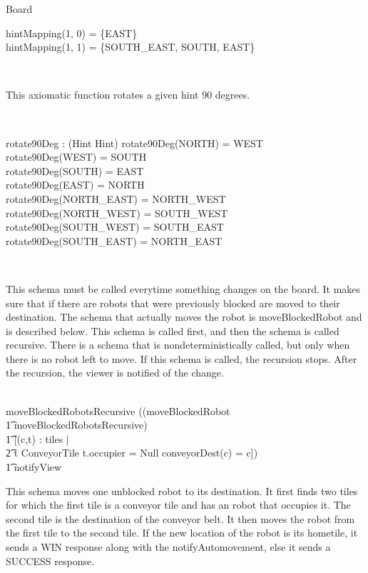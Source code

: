 \documentclass[12pt]{article}
\begin{document}
\begin{class}{Board}
\begin{axdef}
hintMapping(1, 0) = \{EAST\} \\
hintMapping(1, 1) = \{SOUTH\_EAST, SOUTH, EAST\} \\
\end{axdef} \\
\begin{zpar}
This axiomatic function rotates a given hint 90 degrees.
\end{zpar} \\
\begin{axdef}
rotate90Deg : \power (Hint \fun Hint)
\where
rotate90Deg(NORTH) = WEST \\
rotate90Deg(WEST) = SOUTH \\
rotate90Deg(SOUTH) = EAST \\
rotate90Deg(EAST) = NORTH \\
rotate90Deg(NORTH\_EAST) = NORTH\_WEST \\
rotate90Deg(NORTH\_WEST) = SOUTH\_WEST \\
rotate90Deg(SOUTH\_WEST) = SOUTH\_EAST \\
rotate90Deg(SOUTH\_EAST) = NORTH\_EAST
\end{axdef} \\
\znewpage
\begin{zpar}
This schema must be called everytime something changes on the board. It makes sure that if there are robots that were previously blocked are moved to their destination. The schema that actually moves the robot is moveBlockedRobot and is described below. This schema is called first, and then the schema is called recursive. There is a schema that is nondeterministically called, but only when there is no robot left to move. If this schema is called, the recursion stops. After the recursion, the viewer is notified of the change.
\end{zpar} \\
moveBlockedRobotsRecursive \sdef ((moveBlockedRobot \; \; \comp \\ \t1 moveBlockedRobotsRecursive) \; \; [] \\ \t1 [\neg \exists (c,t) : tiles | \\ \t2 t \in ConveyorTile \wedge t.occupier \not = Null \wedge conveyorDest(c) = c]) \; \; \comp \\ \t1 notifyView \\
\also \also \also
\begin{zpar}
This schema moves one unblocked robot to its destination. It first finds two tiles for which the first tile is a conveyor tile and has an robot that occupies it. The second tile is the destination of the conveyor belt. It then moves the robot from the first tile to the second tile. If the new location of the robot is its hometile, it sends a WIN response along with the notifyAutomovement, else it sends a SUCCESS response.

\end{zpar}
\end{class}
\end{document}
